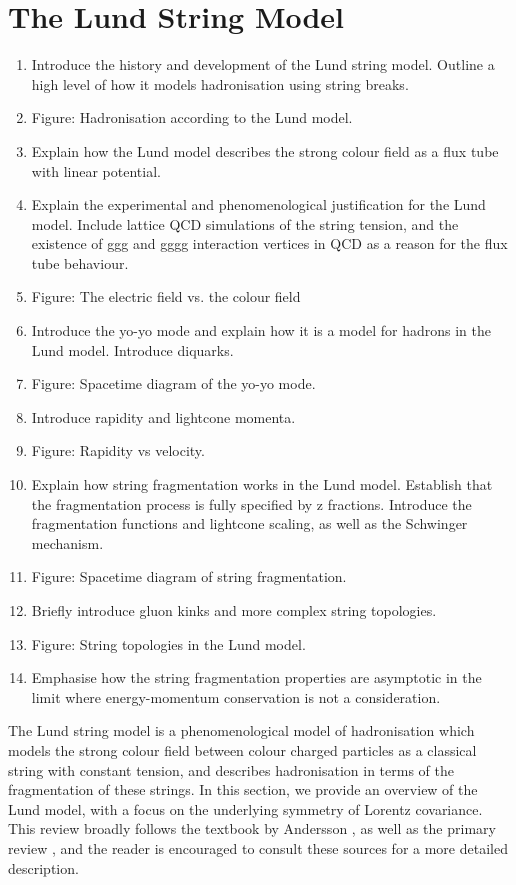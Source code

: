 \documentclass[12pt,a4paper]{report}
\begin{document}
\section{The Lund String Model}
\label{sec:lsm}
\begin{enumerate}
\item Introduce the history and development of the Lund string model. Outline a high level of how it models hadronisation using string breaks.
\item Figure: Hadronisation according to the Lund model.
\item Explain how the Lund model describes the strong colour field as a flux tube with linear potential.
\item Explain the experimental and phenomenological justification for the Lund model. Include lattice QCD simulations of the string tension, and the existence of ggg and gggg interaction vertices in QCD as a reason for the flux tube behaviour.
\item Figure: The electric field vs. the colour field
\item Introduce the yo-yo mode and explain how it is a model for hadrons in the Lund model. Introduce diquarks.
\item Figure: Spacetime diagram of the yo-yo mode.
\item Introduce rapidity and lightcone momenta.
\item Figure: Rapidity vs velocity.
\item Explain how string fragmentation works in the Lund model. Establish that the fragmentation process is fully specified by z fractions. Introduce the fragmentation functions and lightcone scaling, as well as the Schwinger mechanism.
\item Figure: Spacetime diagram of string fragmentation.
\item Briefly introduce gluon kinks and more complex string topologies.
\item Figure: String topologies in the Lund model.
\item Emphasise how the string fragmentation properties are asymptotic in the limit where energy-momentum conservation is not a consideration.
\end{enumerate}

The Lund string model is a phenomenological model of hadronisation which models the strong colour field between colour charged particles as a classical string with constant tension, and describes hadronisation in terms of the fragmentation of these strings. In this section, we provide an overview of the Lund model, with a focus on the underlying symmetry of Lorentz covariance. This review broadly follows the textbook by Andersson \cite{Andersson:1997xwk}, as well as the primary review \cite{Andersson:1983ia}, and the reader is encouraged to consult these sources for a more detailed description.
\end{document}
